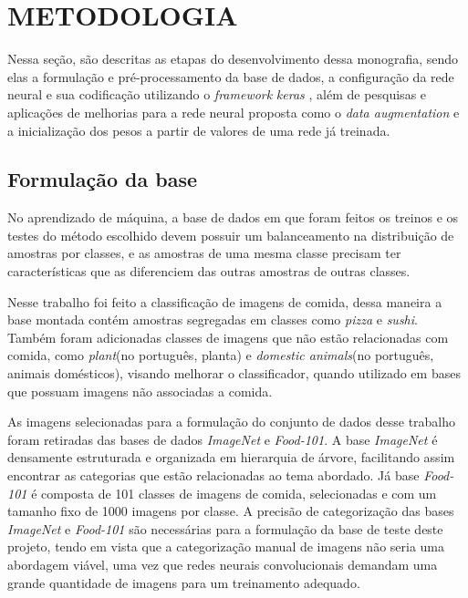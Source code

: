 
\chapter{METODOLOGIA}
\label{chap:metodologia}
Nessa seção, são descritas as etapas do desenvolvimento dessa monografia, sendo elas a formulação e pré-processamento da base de dados, a configuração da rede neural e sua codificação utilizando o \textit{framework} \textit{keras} \cite{chollet2015keras}, além de pesquisas e aplicações de melhorias para a rede neural proposta como o \textit{data augmentation} e a inicialização dos pesos a partir de valores de uma rede já treinada.

\section{Formulação da base}
No aprendizado de máquina, a base de dados em que foram feitos os treinos e os testes do método escolhido devem possuir um balanceamento na distribuição de amostras por classes, e as amostras de uma mesma classe precisam ter características que as diferenciem das outras amostras de outras classes.

\par Nesse trabalho foi feito a classificação de imagens de comida, dessa maneira a base montada contém amostras segregadas em classes como \textit{pizza} e \textit{sushi}. Também foram adicionadas classes de imagens que não estão relacionadas com comida, como \textit{plant}(no português, planta) e \textit{domestic animals}(no português, animais domésticos), visando melhorar o classificador, quando utilizado em bases que possuam imagens não associadas a comida.
\par As imagens selecionadas para a formulação do conjunto de dados desse trabalho foram retiradas das bases de dados \textit{ImageNet}\cite{deng2009imagenet} e \textit{Food-101}\cite{bossard14}. A base \textit{ImageNet} é densamente estruturada e organizada em hierarquia de árvore, facilitando assim encontrar as categorias que estão relacionadas ao tema abordado. Já base \textit{Food-101} é composta de 101 classes de imagens de comida, selecionadas e com um tamanho fixo de 1000 imagens por classe. A precisão de categorização das bases \textit{ImageNet} e \textit{Food-101} são necessárias para a formulação da base de teste deste projeto, tendo em vista que a categorização manual de imagens não seria uma abordagem viável, uma vez que redes neurais convolucionais demandam uma grande quantidade de imagens para um treinamento adequado.  

